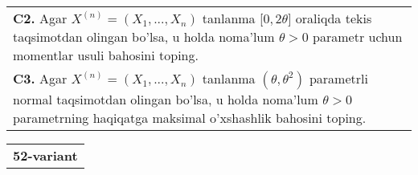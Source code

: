 \documentclass{article}
\begin{document}
\begin{tabular}{m{17cm}}
\\
\textbf{C2.} 
Agar \(X^{(n)} = \left( X_{1},...,X_{n} \right)\) tanlanma {[}\(0,2\theta\rbrack\) oraliqda tekis taqsimotdan olingan bo'lsa, u holda noma'lum \(\theta > 0\) parametr uchun momentlar usuli bahosini toping.
\\
\textbf{C3.} 
Agar \(X^{(n)} = \left( X_{1},...,X_{n} \right)\) tanlanma \(\left( \theta,\theta^{2} \right)\) parametrli normal taqsimotdan olingan bo'lsa, u holda noma'lum \(\theta > 0\) parametrning haqiqatga maksimal o'xshashlik bahosini toping.
\\

\end{tabular}
\vspace{1cm}


\begin{tabular}{m{17cm}}
\textbf{52-variant}
\newline


\end{tabular}
\end{document}
